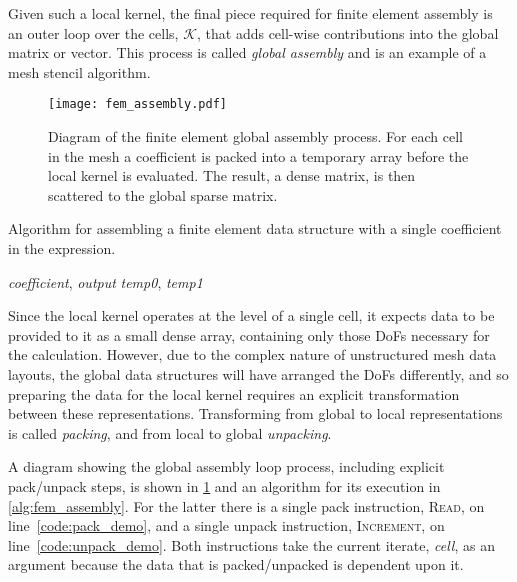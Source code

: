\documentclass[thesis]{subfiles}
\begin{document}
Given such a local kernel, the final piece required for finite element assembly is an outer loop over the cells, $\mathcal{K}$, that adds cell-wise contributions into the global matrix or vector.
This process is called \emph{global assembly} and is an example of a mesh stencil algorithm.

\begin{figure}
  \centering
  \texttt{[image: fem\_assembly.pdf]}
  \caption{
    Diagram of the finite element global assembly process.
    For each cell in the mesh a coefficient is packed into a temporary array before the local kernel is evaluated.
    The result, a dense matrix, is then scattered to the global sparse matrix.
  }
  \label{fig:fem_assembly}
\end{figure}

\begin{algorithm}
  \caption{
    Algorithm for assembling a finite element data structure with a single coefficient in the expression.
  }
  \begin{algorithmic}[1]
    \Require \textit{coefficient}, \textit{output} 
    \Require \textit{temp0}, \textit{temp1} 

      \State {} \label{code:pack_demo}
      \State {} 
      \State {} 
      \State {} \label{code:unpack_demo}
    \EndFor
  \end{algorithmic}
  \label{alg:fem_assembly}
\end{algorithm}

Since the local kernel operates at the level of a single cell, it expects data to be provided to it as a small dense array, containing only those DoFs necessary for the calculation.
However, due to the complex nature of unstructured mesh data layouts, the global data structures will have arranged the DoFs differently, and so preparing the data for the local kernel requires an explicit transformation between these representations.
Transforming from global to local representations is called \emph{packing}, and from local to global \emph{unpacking}.

A diagram showing the global assembly loop process, including explicit pack/unpack steps, is shown in \cref{fig:fem_assembly} and an algorithm for its execution in \cref{alg:fem_assembly}.
For the latter there is a single pack instruction, \textsc{Read}, on line~\ref{code:pack_demo}, and a single unpack instruction, \textsc{Increment}, on line~\ref{code:unpack_demo}.
Both instructions take the current iterate, \textit{cell}, as an argument because the data that is packed/unpacked is dependent upon it.
\end{document}

